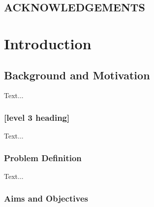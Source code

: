 \documentclass[12pt,a4paper]{report}
\begin{document}

\newpage \section*{ACKNOWLEDGEMENTS}



\tableofcontents

\thispagestyle{empty}


\chapter{Introduction}


\setcounter{page}{1}



\section{Background and Motivation}


Text...

\subsection{[level 3 heading]}




Text...

\subsection{Problem Definition}


Text...

\subsection{Aims and Objectives}

\end{document}
